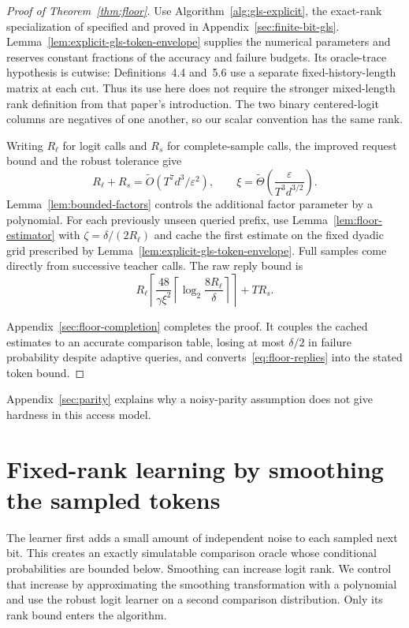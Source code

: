 \documentclass[11pt]{article}
\theoremstyle{definition}
\theoremstyle{remark}
\begin{document}
\begin{proof}[Proof of Theorem~\ref{thm:floor}]
Use Algorithm~\ref{alg:gls-explicit}, the exact-rank specialization of \citet[Theorem~5.11]{gls2} specified and proved in Appendix~\ref{sec:finite-bit-gls}. Lemma~\ref{lem:explicit-gls-token-envelope} supplies the numerical parameters and reserves constant fractions of the accuracy and failure budgets. Its oracle-trace hypothesis is cutwise: Definitions~4.4 and~5.6 use a separate fixed-history-length matrix at each cut. Thus its use here does not require the stronger mixed-length rank definition from that paper's introduction. The two binary centered-logit columns are negatives of one another, so our scalar convention has the same rank.

Writing $R_\ell$ for logit calls and $R_s$ for complete-sample calls, the improved request bound and the robust tolerance give
\[
R_\ell+R_s=\widetilde O(T^7d^3/\varepsilon^2),
\qquad
\xi=\widetilde\Theta\!\left(\frac{\varepsilon}{T^3d^{3/2}}\right).
\]
Lemma~\ref{lem:bounded-factors} controls the additional factor parameter by a polynomial. For each previously unseen queried prefix, use Lemma~\ref{lem:floor-estimator} with $\zeta=\delta/(2R_\ell)$ and cache the first estimate on the fixed dyadic grid prescribed by Lemma~\ref{lem:explicit-gls-token-envelope}. Full samples come directly from successive teacher calls. The raw reply bound is
\begin{equation}\label{eq:floor-replies}
R_\ell\left\lceil\frac{48}{\gamma\xi^2}
\left\lceil\log_2\frac{8R_\ell}{\delta}\right\rceil\right\rceil+TR_s.
\end{equation}

Appendix~\ref{sec:floor-completion} completes the proof. It couples the cached estimates to an accurate comparison table, losing at most $\delta/2$ in failure probability despite adaptive queries, and converts~\eqref{eq:floor-replies} into the stated token bound.
\end{proof}

Appendix~\ref{sec:parity} explains why a noisy-parity assumption does not give hardness in this access model.


\section{Fixed-rank learning by smoothing the sampled tokens}\label{sec:fixed-rank}

The learner first adds a small amount of independent noise to each sampled next bit. This creates an exactly simulatable comparison oracle whose conditional probabilities are bounded below. Smoothing can increase logit rank. We control that increase by approximating the smoothing transformation with a polynomial and use the robust logit learner on a second comparison distribution. Only its rank bound enters the algorithm.
\end{document}
